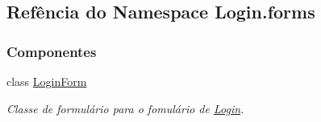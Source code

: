 \hypertarget{namespaceLogin_1_1forms}{\subsection{Refência do Namespace Login.\-forms}
\label{namespaceLogin_1_1forms}
}
\subsubsection*{Componentes}
\begin{DoxyCompactItemize}
\item 
class \hyperlink{classLogin_1_1forms_1_1LoginForm}{Login\-Form}
\begin{DoxyCompactList}\small\item\em Classe de formulário para o fomulário de \hyperlink{namespaceLogin}{Login}. \end{DoxyCompactList}\end{DoxyCompactItemize}
